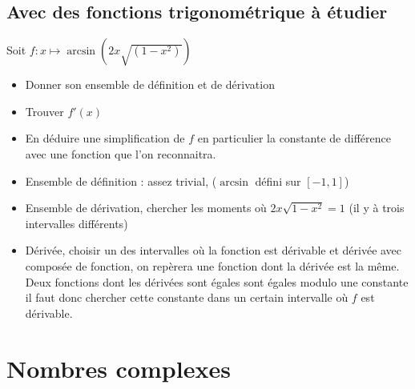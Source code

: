 \documentclass{article}
\begin{document}
\subsection{Avec des fonctions trigonométrique à étudier}%
\label{sub:Avec des fonctions trigonométrique à étudier}

\begin{exercise}

  Soit $f:x \mapsto \arcsin\left(2x\sqrt{(1-x^2)}\right)$
  \begin{itemize}
    \item Donner son ensemble de définition et de dérivation
    \item Trouver $f'(x)$
    \item En déduire une simplification de $f$ en particulier la constante de différence avec une fonction que l'on reconnaitra.
  \end{itemize}
\end{exercise}

\begin{solution}
  \leavevmode
  \begin{itemize}
    \item Ensemble de définition : assez trivial, ($\arcsin$ défini sur $[-1, 1]$)
  
    \item  Ensemble de dérivation, chercher les moments où $ 2x\sqrt{1-x^2}=1$ (il y à trois intervalles différents)

    \item  Dérivée, choisir un des intervalles où la fonction est dérivable et dérivée avec composée de fonction, on repèrera une fonction dont la dérivée est la même. Deux fonctions dont les dérivées sont égales sont égales modulo une constante il faut donc chercher cette constante dans un certain intervalle où $f$ est dérivable.
\end{itemize}
\end{solution}


\section{Nombres complexes}%
\label{sec:Nombres complexes}
\end{document}
